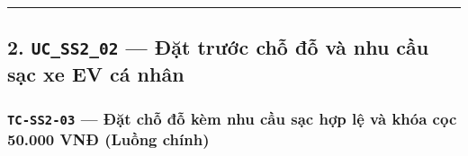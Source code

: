 \documentclass[11pt,a4paper]{article}
\begin{document}
\begin{center}\rule{0.5\linewidth}{0.5pt}\end{center}

\hypertarget{uc_ss2_02-ux111ux1eb7t-trux1b0ux1edbc-chux1ed7-ux111ux1ed7-vuxe0-nhu-cux1ea7u-sux1ea1c-xe-ev-cuxe1-nhuxe2n}{%
\subsection{\texorpdfstring{2. \texttt{UC\_SS2\_02} --- Đặt trước chỗ đỗ
và nhu cầu sạc xe EV cá
nhân}{2. UC\_SS2\_02 --- Đặt trước chỗ đỗ và nhu cầu sạc xe EV cá nhân}}\label{uc_ss2_02-ux111ux1eb7t-trux1b0ux1edbc-chux1ed7-ux111ux1ed7-vuxe0-nhu-cux1ea7u-sux1ea1c-xe-ev-cuxe1-nhuxe2n}}

\hypertarget{tc-ss2-03-ux111ux1eb7t-chux1ed7-ux111ux1ed7-kuxe8m-nhu-cux1ea7u-sux1ea1c-hux1ee3p-lux1ec7-vuxe0-khuxf3a-cux1ecdc-50.000-vnux111-luux1ed3ng-chuxednh}{%
\subsubsection{\texorpdfstring{\texttt{TC-SS2-03} --- Đặt chỗ đỗ kèm nhu
cầu sạc hợp lệ và khóa cọc 50.000 VNĐ (Luồng
chính)}{TC-SS2-03 --- Đặt chỗ đỗ kèm nhu cầu sạc hợp lệ và khóa cọc 50.000 VNĐ (Luồng chính)}}\label{tc-ss2-03-ux111ux1eb7t-chux1ed7-ux111ux1ed7-kuxe8m-nhu-cux1ea7u-sux1ea1c-hux1ee3p-lux1ec7-vuxe0-khuxf3a-cux1ecdc-50.000-vnux111-luux1ed3ng-chuxednh}}
\end{document}
